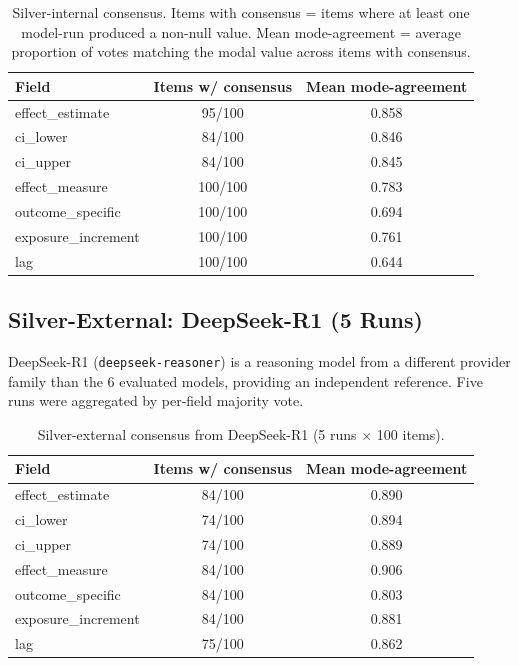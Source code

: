 \documentclass[11pt]{article}
\newenvironment{fittab}{\begin{lrbox}{\fittabbox}}{\end{lrbox}%
  \ifdim\wd\fittabbox>\linewidth\resizebox{\linewidth}{!}{\usebox{\fittabbox}}\else\usebox{\fittabbox}\fi}
\begin{document}
\begin{table}[htbp]
\centering
\caption{Silver-internal consensus. Items with consensus = items where at least one model-run produced a non-null value. Mean mode-agreement = average proportion of votes matching the modal value across items with consensus.}
\label{tab:silver_internal}
\begin{fittab}\begin{tabular}{lcc}
\toprule
\textbf{Field} & \textbf{Items w/ consensus} & \textbf{Mean mode-agreement} \\
\midrule
effect\_estimate     & 95/100 & 0.858 \\
ci\_lower            & 84/100 & 0.846 \\
ci\_upper            & 84/100 & 0.845 \\
effect\_measure      & 100/100 & 0.783 \\
outcome\_specific    & 100/100 & 0.694 \\
exposure\_increment  & 100/100 & 0.761 \\
lag                  & 100/100 & 0.644 \\
\bottomrule
\end{tabular}\end{fittab}
\end{table}

\subsection{Silver-External: DeepSeek-R1 (5 Runs)}

DeepSeek-R1 (\texttt{deepseek-reasoner}) is a reasoning model from a different provider family than the 6 evaluated models, providing an independent reference. Five runs were aggregated by per-field majority vote.

\begin{table}[htbp]
\centering
\caption{Silver-external consensus from DeepSeek-R1 (5 runs $\times$ 100 items).}
\label{tab:silver_external}
\begin{fittab}\begin{tabular}{lcc}
\toprule
\textbf{Field} & \textbf{Items w/ consensus} & \textbf{Mean mode-agreement} \\
\midrule
effect\_estimate     & 84/100 & 0.890 \\
ci\_lower            & 74/100 & 0.894 \\
ci\_upper            & 74/100 & 0.889 \\
effect\_measure      & 84/100 & 0.906 \\
outcome\_specific    & 84/100 & 0.803 \\
exposure\_increment  & 84/100 & 0.881 \\
lag                  & 75/100 & 0.862 \\
\bottomrule
\end{tabular}\end{fittab}
\end{table}
\end{document}
